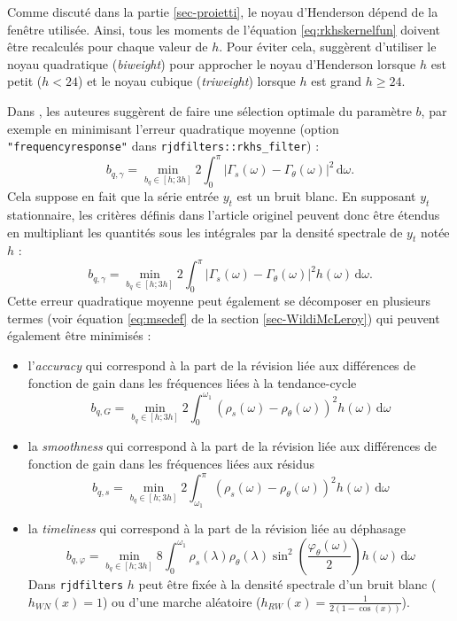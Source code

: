 \documentclass[
  11pt,
  french,
  a4paper]{article}
\newcommand\1{\mathds{1}}
\newcommand\ud{\,\mathrm{d}}
\begin{document}
Comme discuté dans la partie \ref{sec-proietti}, le noyau d'Henderson dépend de la fenêtre utilisée.
Ainsi, tous les moments de l'équation \eqref{eq:rkhskernelfun} doivent être recalculés pour chaque valeur de \(h\).
Pour éviter cela, \textcite{dagumbianconcini2008} suggèrent d'utiliser le noyau quadratique (\emph{biweight}) pour approcher le noyau d'Henderson lorsque \(h\) est petit (\(h< 24\)) et le noyau cubique (\emph{triweight}) lorsque \(h\) est grand \(h\geq 24\).

Dans \textcite{dagumbianconcini2015new}, les auteures suggèrent de faire une sélection optimale du paramètre \(b\), par exemple en minimisant l'erreur quadratique moyenne (option \texttt{"frequencyresponse"} dans \texttt{rjdfilters::rkhs\_filter}) :
\[
b_{q,\gamma}=\underset{b_q\in[h; 3h]}{\min}
2\int_{0}^{\pi}
\lvert \Gamma_s(\omega)-\Gamma_\theta(\omega)\rvert^2\ud \omega.
\]
Cela suppose en fait que la série entrée \(y_t\) est un bruit blanc.
En supposant \(y_t\) stationnaire, les critères définis dans l'article originel peuvent donc être étendus en multipliant les quantités sous les intégrales par la densité spectrale de \(y_t\) notée \(h\) :
\[
b_{q,\gamma}=\underset{b_q\in[h; 3h]}{\min}
2\int_{0}^{\pi}
\lvert \Gamma_s(\omega)-\Gamma_\theta(\omega)\rvert^2h(\omega)\ud \omega.
\]
Cette erreur quadratique moyenne peut également se décomposer en plusieurs termes (voir équation \eqref{eq:msedef} de la section \ref{sec-WildiMcLeroy}) qui peuvent également être minimisés :

\begin{itemize}
\item
  l'\emph{accuracy} qui correspond à la part de la révision liée aux différences de fonction de gain dans les fréquences liées à la tendance-cycle
  \[
  b_{q,G}=\underset{b_q\in[h; 3h]}{\min}
  2\int_{0}^{\omega_1}
  \left(\rho_s(\omega)-\rho_\theta(\omega)\right)^{2} h(\omega)\ud \omega
  \]
\item
  la \emph{smoothness} qui correspond à la part de la révision liée aux différences de fonction de gain dans les fréquences liées aux résidus
  \[
  b_{q,s}=\underset{b_q\in[h; 3h]}{\min}
  2\int_{\omega_1}^{\pi}
  \left(\rho_s(\omega)-\rho_\theta(\omega)\right)^{2} h(\omega)\ud \omega
  \]
\item
  la \emph{timeliness} qui correspond à la part de la révision liée au déphasage
  \[
  b_{q,\varphi}=\underset{b_q\in[h; 3h]}{\min}
  8\int_{0}^{\omega_1}
  \rho_s(\lambda)\rho_\theta(\lambda)\sin^{2}\left(\frac{\varphi_\theta(\omega)}{2}\right)h(\omega)\ud \omega
  \]
  Dans \texttt{rjdfilters} \(h\) peut être fixée à la densité spectrale d'un bruit blanc (\(h_{WN}(x)=1\)) ou d'une marche aléatoire (\(h_{RW}(x)=\frac{1}{2(1-\cos(x))}\)).
\end{itemize}
\end{document}
